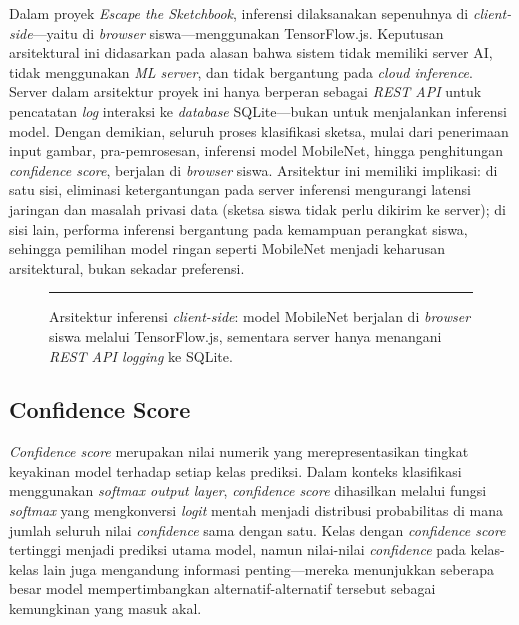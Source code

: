 \documentclass[12pt,oneside]{report}
\begin{document}
Dalam proyek \textit{Escape the Sketchbook}, inferensi dilaksanakan sepenuhnya di \textit{client-side}—yaitu di \textit{browser} siswa—menggunakan TensorFlow.js. Keputusan arsitektural ini didasarkan pada alasan bahwa sistem tidak memiliki server AI, tidak menggunakan \textit{ML server}, dan tidak bergantung pada \textit{cloud inference}. Server dalam arsitektur proyek ini hanya berperan sebagai \textit{REST API} untuk pencatatan \textit{log} interaksi ke \textit{database} SQLite—bukan untuk menjalankan inferensi model. Dengan demikian, seluruh proses klasifikasi sketsa, mulai dari penerimaan input gambar, pra-pemrosesan, inferensi model MobileNet, hingga penghitungan \textit{confidence score}, berjalan di \textit{browser} siswa. Arsitektur ini memiliki implikasi: di satu sisi, eliminasi ketergantungan pada server inferensi mengurangi latensi jaringan dan masalah privasi data (sketsa siswa tidak perlu dikirim ke server); di sisi lain, performa inferensi bergantung pada kemampuan perangkat siswa, sehingga pemilihan model ringan seperti MobileNet menjadi keharusan arsitektural, bukan sekadar preferensi.

\begin{figure}[H]
\centering
\rule{0.9\textwidth}{6cm}
\caption{Arsitektur inferensi \textit{client-side}: model MobileNet berjalan di \textit{browser} siswa melalui TensorFlow.js, sementara server hanya menangani \textit{REST API logging} ke SQLite.}
\label{fig:arsitektur-client-side}
\end{figure}

\subsection{Confidence Score}
\label{subsec:confidence-score}

\textit{Confidence score} merupakan nilai numerik yang merepresentasikan tingkat keyakinan model terhadap setiap kelas prediksi. Dalam konteks klasifikasi menggunakan \textit{softmax output layer}, \textit{confidence score} dihasilkan melalui fungsi \textit{softmax} yang mengkonversi \textit{logit} mentah menjadi distribusi probabilitas di mana jumlah seluruh nilai \textit{confidence} sama dengan satu. Kelas dengan \textit{confidence score} tertinggi menjadi prediksi utama model, namun nilai-nilai \textit{confidence} pada kelas-kelas lain juga mengandung informasi penting—mereka menunjukkan seberapa besar model mempertimbangkan alternatif-alternatif tersebut sebagai kemungkinan yang masuk akal.
\end{document}
